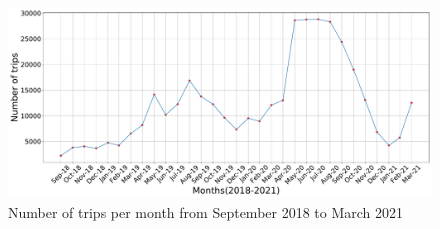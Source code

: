 \documentclass[11pt,a4paper]{article}
\begin{document}
\begin{figure}[h]
    \centering
    \includegraphics[width=\linewidth]{datasets/total_trips_per_month.pdf}
    \caption{Number of trips per month from September 2018 to March 2021}
    \label{total_trips_per_month}
\end{figure}
\end{document}
